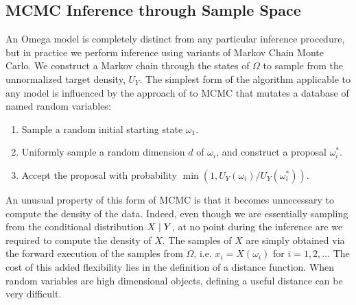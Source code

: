 


\subsection{MCMC Inference through Sample Space}
An Omega model is completely distinct from any particular inference procedure, but in practice we perform inference using variants of Markov Chain Monte Carlo.
We construct a Markov chain through the states of $\Omega$ to sample from the unnormalized target density, $U_Y$.  The simplest form of the algorithm applicable to any model is influenced by the approach of \citep{wingate2011lightweight, milch20071} to MCMC that mutates a database of named random variables:
\begin{enumerate}
\item Sample a random initial starting state $\omega_1$.
\item Uniformly sample a random dimension $d$ of $\omega_i$, and construct a proposal $\omega^*_i$.
\item Accept the proposal with probability $\min(1, U_Y(\omega_i) / U_Y(\omega^*_i))$.
\end{enumerate}

An unusual property of this form of MCMC is that it becomes unnecessary to compute the density of the data. Indeed, even though we are essentially sampling from the conditional distribution $X \mid Y$, at no point during the inference are we required to compute the density of $X$. The samples of $X$ are simply obtained via the forward execution of the samples from $\Omega$, i.e. $x_i = X(\omega_i)$ for $i = 1, 2, \dots$ The cost of this added flexibility lies in the definition of a distance function. When random variables are high dimensional objects, defining a useful distance can be very difficult.

